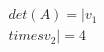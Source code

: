 \documentclass[preview]{standalone}
\begin{document}
\begin{align*}
\quad\\det(A) = |v_1 \quad\\times v_2| = 4
\end{align*}
\end{document}
